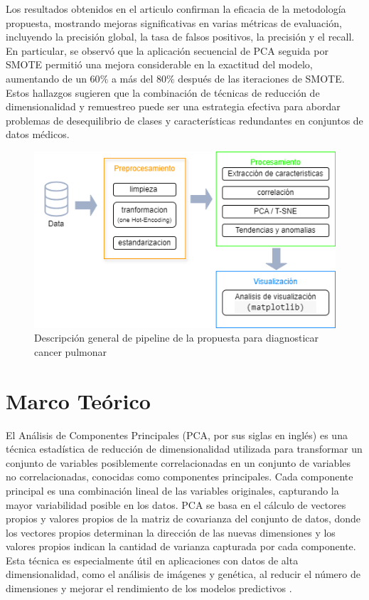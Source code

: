 \documentclass[10pt,journal,compsoc]{IEEEtran}
\begin{document}
Los resultados obtenidos en el articulo  \cite{arxiv14031949} confirman la eficacia de la metodología propuesta, mostrando mejoras significativas en varias métricas de evaluación, incluyendo la precisión global, la tasa de falsos positivos, la precisión y el recall. En particular, se observó que la aplicación secuencial de PCA seguida por SMOTE permitió una mejora considerable en la exactitud del modelo, aumentando de un 60$\%$ a más del 80$\%$ después de las iteraciones de SMOTE. Estos hallazgos sugieren que la combinación de técnicas de reducción de dimensionalidad y remuestreo puede ser una estrategia efectiva para abordar problemas de desequilibrio de clases y características redundantes en conjuntos de datos médicos.


\begin{figure}[htb]
    \centering
    \includegraphics[width=\linewidth]{imagenes/pipeline.png} %
    \caption{Descripción general de pipeline de la propuesta para diagnosticar cancer pulmonar}
    \label{fig:pipeline}
\end{figure}


\section{Marco Teórico}
El Análisis de Componentes Principales (PCA, por sus siglas en inglés) es una técnica estadística de reducción de dimensionalidad utilizada para transformar un conjunto de variables posiblemente correlacionadas en un conjunto de variables no correlacionadas, conocidas como componentes principales. Cada componente principal es una combinación lineal de las variables originales, capturando la mayor variabilidad posible en los datos. PCA se basa en el cálculo de vectores propios y valores propios de la matriz de covarianza del conjunto de datos, donde los vectores propios determinan la dirección de las nuevas dimensiones y los valores propios indican la cantidad de varianza capturada por cada componente. Esta técnica es especialmente útil en aplicaciones con datos de alta dimensionalidad, como el análisis de imágenes y genética, al reducir el número de dimensiones y mejorar el rendimiento de los modelos predictivos \cite{jolliffe2016pca}.
\end{document}
